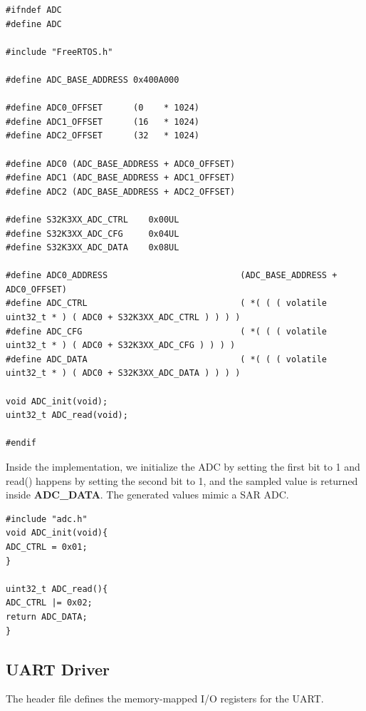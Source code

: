 \documentclass{article}
\begin{document}
\begin{verbatim}
#ifndef ADC
#define ADC

#include "FreeRTOS.h"

#define ADC_BASE_ADDRESS 0x400A000

#define ADC0_OFFSET      (0    * 1024)
#define ADC1_OFFSET      (16   * 1024)
#define ADC2_OFFSET      (32   * 1024)

#define ADC0 (ADC_BASE_ADDRESS + ADC0_OFFSET)
#define ADC1 (ADC_BASE_ADDRESS + ADC1_OFFSET)
#define ADC2 (ADC_BASE_ADDRESS + ADC2_OFFSET)

#define S32K3XX_ADC_CTRL    0x00UL
#define S32K3XX_ADC_CFG     0x04UL
#define S32K3XX_ADC_DATA    0x08UL

#define ADC0_ADDRESS                          (ADC_BASE_ADDRESS + ADC0_OFFSET)
#define ADC_CTRL                              ( *( ( ( volatile uint32_t * ) ( ADC0 + S32K3XX_ADC_CTRL ) ) ) )
#define ADC_CFG                               ( *( ( ( volatile uint32_t * ) ( ADC0 + S32K3XX_ADC_CFG ) ) ) )
#define ADC_DATA                              ( *( ( ( volatile uint32_t * ) ( ADC0 + S32K3XX_ADC_DATA ) ) ) )

void ADC_init(void);
uint32_t ADC_read(void);

#endif
\end{verbatim}

Inside the implementation, we initialize the ADC by setting the first bit to 1 and read() happens by setting the second bit to 1, and the sampled value is returned inside \textbf{ADC\_DATA}.
The generated values mimic a SAR ADC.







\begin{verbatim}
#include "adc.h"
void ADC_init(void){
ADC_CTRL = 0x01;
}

uint32_t ADC_read(){
ADC_CTRL |= 0x02;
return ADC_DATA;
}
\end{verbatim}






\subsection{UART Driver}
The header file defines the memory-mapped I/O registers for the UART.
\end{document}
